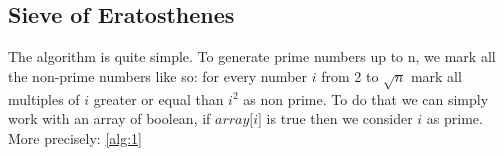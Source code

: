 
\subsection{Sieve of Eratosthenes}

The algorithm is quite simple. To generate prime numbers up to n, we mark all the non-prime numbers like so: for every number $\textit{i}$ from 2 to $\sqrt{n}$ mark all multiples of $\textit{i}$ greater or equal than $\textit{i}^{2}$ as non prime. To do that we can simply work with an array of boolean, if $\textit{array[i]}$ is true then we consider $\textit{i}$ as prime.\\More precisely: \ref{alg:1}











